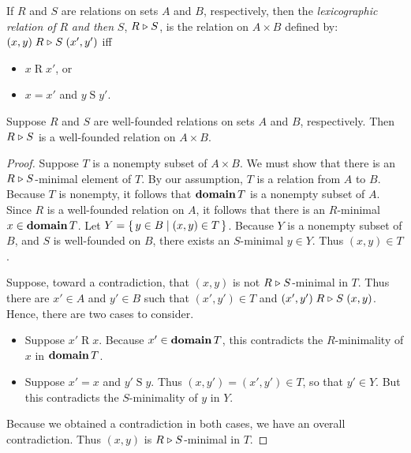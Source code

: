 If $R$ and $S$ are relations on
sets $A$ and $B$, respectively, then the \emph{lexicographic relation of}
%
%
%
%
$R$ \emph{and then} $S$, $R\mathrel{\triangleright} S$, is the relation on $A\times B$ defined
by: $(x,y)\mathrel{R\mathrel{\triangleright} S}(x',y')$ iff
\begin{itemize}
\item $x\mathrel{R}x'$, or

\item $x = x'$ and $y\mathrel{S}y'$.
\end{itemize}

\begin{proposition}
\label{LexWellFounded}
Suppose $R$ and $S$ are well-founded relations on sets $A$ and
$B$, respectively.  Then $R\mathrel{\triangleright} S$ is a well-founded relation on
$A\times B$.  
\end{proposition}

\begin{proof}
Suppose $T$ is a nonempty subset of $A\times B$.  We must show that
there is an $R\mathrel{\triangleright} S$-minimal element of $T$.  By our assumption,
$T$ is a relation from $A$ to $B$.  Because $T$ is nonempty, it
follows that $\mathbf{domain}\,T$ is a nonempty subset of $A$.  Since
$R$ is a well-founded relation on $A$, it follows that there
is an $R$-minimal $x\in\mathbf{domain}\,T$.  Let $Y=\{ \, y\in B \mid (x,y)\in T \, \}$.
Because $Y$ is a nonempty subset of $B$, and
$S$ is well-founded on $B$, there exists an $S$-minimal $y\in Y$.
Thus $(x,y)\in T$.

Suppose, toward a contradiction, that
$(x,y)$ is not $R\mathrel{\triangleright} S$-minimal in $T$.  Thus there are
$x'\in A$ and $y'\in B$ such that $(x',y')\in T$ and
$(x',y')\mathrel{R\mathrel{\triangleright} S}(x,y)$.  Hence, there are two cases to
consider.
\begin{itemize}
\item Suppose $x'\mathrel{R}x$.  Because $x'\in\mathbf{domain}\,T$, this
contradicts the $R$-minimality of $x$ in $\mathbf{domain}\,T$.

\item Suppose $x'=x$ and $y'\mathrel{S}y$.  Thus $(x,y')=(x',y')\in T$,
so that $y'\in Y$.  But this contradicts the $S$-minimality of $y$
in $Y$.
\end{itemize}
Because we obtained a contradiction in both cases, we have
an overall contradiction.  Thus $(x,y)$ is $R\mathrel{\triangleright} S$-minimal in $T$.
\end{proof}

